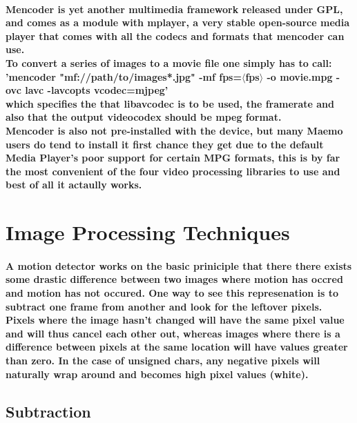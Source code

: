 \documentclass[11pt]{article} %
\begin{document}
\paragraph{Mencoder is yet another multimedia framework released under GPL, and comes as a module with mplayer, a very stable open-source media player that comes with all the codecs and formats that mencoder can use.\\
To convert a series of images to a movie file one simply has to call:\\
'mencoder "mf://path/to/images*.jpg" -mf fps=\(\langle\)fps\(\rangle\) -o movie.mpg -ovc lavc -lavcopts vcodec=mjpeg'\\
which specifies the that libavcodec is to be used, the framerate and also that the output videocodex should be mpeg format.
\\Mencoder is also not pre-installed with the device, but many Maemo users do tend to install it first chance they get due to the default Media Player's poor support for certain MPG formats, this is by far the most convenient of the four video processing libraries to use and best of all it actaully works.
}
\section{Image Processing Techniques}
\paragraph{A motion detector works on the basic priniciple that there there exists some drastic difference between two images where motion has occred and motion has not occured. One way to see this represenation is to subtract one frame from another and look for the leftover pixels. Pixels where the image hasn't changed will have the same pixel value and will thus cancel each other out, whereas images where there is a difference between pixels at the same location will have values greater than zero. In the case of unsigned chars, any negative pixels will naturally wrap around and becomes high pixel values (white).}
\subsection{Subtraction}
\end{document}
